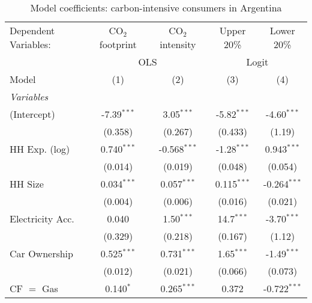 
\begin{table}[htbp!]
   \centering
   \small
   \begin{adjustbox}{width = 1\textwidth, max height = 0.95\textheight, center}
      \begin{threeparttable}[b]
         \caption{\label{tab:Logit_1_ARG} Model coefficients: carbon-intensive consumers in Argentina}
         \begin{tabular}{lcccc}
            \tabularnewline \midrule \midrule
            Dependent Variables: & CO$_{2}$ footprint & CO$_{2}$ intensity & Upper 20\%     & Lower 20\%\\   
             & \multicolumn{2}{c}{OLS} & \multicolumn{2}{c}{Logit} \\ 
            Model                & (1)                & (2)                & (3)            & (4)\\  
            \midrule
            \emph{Variables}\\
            (Intercept)          & -7.39$^{***}$      & 3.05$^{***}$       & -5.82$^{***}$  & -4.60$^{***}$\\   
                                 & (0.358)            & (0.267)            & (0.433)        & (1.19)\\   
            HH Exp. (log)        & 0.740$^{***}$      & -0.568$^{***}$     & -1.28$^{***}$  & 0.943$^{***}$\\   
                                 & (0.014)            & (0.019)            & (0.048)        & (0.054)\\   
            HH Size              & 0.034$^{***}$      & 0.057$^{***}$      & 0.115$^{***}$  & -0.264$^{***}$\\   
                                 & (0.004)            & (0.006)            & (0.016)        & (0.021)\\   
            Electricity Acc.     & 0.040              & 1.50$^{***}$       & 14.7$^{***}$   & -3.70$^{***}$\\   
                                 & (0.329)            & (0.218)            & (0.167)        & (1.12)\\   
            Car Ownership        & 0.525$^{***}$      & 0.731$^{***}$      & 1.65$^{***}$   & -1.49$^{***}$\\   
                                 & (0.012)            & (0.021)            & (0.066)        & (0.073)\\   
            CF $=$ Gas           & 0.140$^{*}$        & 0.265$^{***}$      & 0.372          & -0.722$^{***}$\\   

\end{tabular}
\end{threeparttable}
\end{adjustbox}
\end{table}
